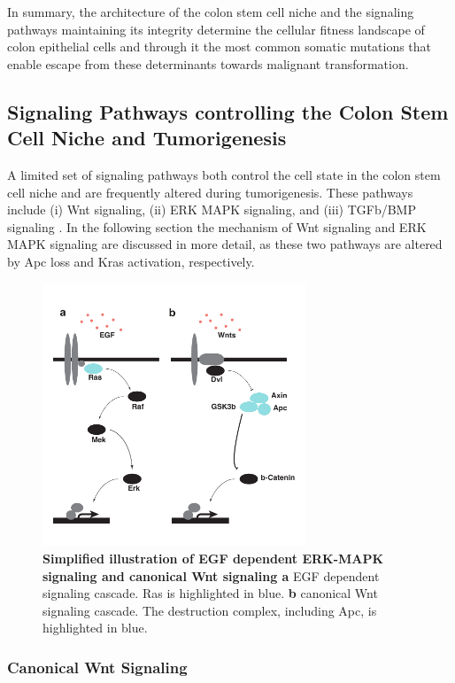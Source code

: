 \begin{flushleft}
In summary, the architecture of the colon stem cell niche and the signaling pathways maintaining its integrity determine the cellular fitness landscape of colon epithelial cells and through it the most common somatic mutations that enable escape from these determinants towards malignant transformation.

\subsection{Signaling Pathways controlling the Colon Stem Cell Niche and Tumorigenesis}

A limited set of signaling pathways both control the cell state in the colon stem cell niche and are frequently altered during tumorigenesis. These pathways include (i) Wnt signaling, (ii) ERK MAPK signaling, and (iii) TGFb/BMP signaling \cite{gehartTalesCryptNew2019a}. In the following section the mechanism of Wnt signaling and ERK MAPK signaling are discussed in more detail, as these two pathways are altered by Apc loss and Kras activation, respectively.

\begin{figure}[h]
\centering
\includegraphics[width=0.7\textwidth,
                keepaspectratio]{figures/adenomaprofiling/pdf/fig_0_1.pdf}
\caption{\textbf{Simplified illustration of EGF dependent ERK-MAPK signaling and canonical Wnt signaling a} EGF dependent signaling cascade. Ras is highlighted in blue. \textbf{b} canonical Wnt signaling cascade. The destruction complex, including Apc, is highlighted in blue.}
\label{fig_180}
\end{figure}
\bigbreak

\subsubsection{Canonical Wnt Signaling}


\end{flushleft}
